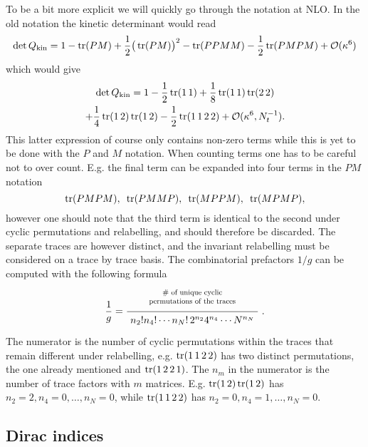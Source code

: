 To be a bit more explicit we will quickly go through the notation at NLO. In the
old notation the kinetic determinant would read
%
\begin{equation} \label{eq:expanded_pm_notation}
  \det Q_{\text{kin}} = 1 - \operatorname{tr}(PM) + \frac{1}{2} \big(\operatorname{tr}(PM)\big)^2 - \operatorname{tr}(PPMM) -
    \frac{1}{2} \operatorname{tr}(PMPM) + \mathcal{O}(\kappa^6)
\end{equation}
%
which would give
%
\begin{multline}
  \det Q_{\text{kin}} = 
    1 - \frac{1}{2} \operatorname{tr}(1\,1) + \frac{1}{8} \operatorname{tr}(1\,1) \operatorname{tr}(2\,2) \\
    + \frac{1}{4}\operatorname{tr} (1\,2) \operatorname{tr} (1\,2) - \frac{1}{2} \operatorname{tr}(1\,1\,2\,2) +
    \mathcal{O}(\kappa^6, N_t^{-1}).
\end{multline}
%
This latter expression of course only contains non-zero terms while this is yet
to be done with the $P$ and $M$ notation. When counting terms one has to be
careful not to over count. E.g. the final term can be expanded into four terms
in the $PM$ notation
%
\begin{equation}
  \operatorname{tr}(PMPM), \hskip.5em \operatorname{tr}(PMMP), \hskip.5em \operatorname{tr}(MPPM), \hskip.5em \operatorname{tr}(MPMP),
\end{equation}
%
however one should note that the third term is identical to the second under
cyclic permutations and relabelling, and should therefore be discarded. The
separate traces are however distinct, and the invariant relabelling must be
considered on a trace by trace basis. The combinatorial prefactors $1/g$ can be
computed with the following formula
%
\begin{equation}
  \frac{1}{g}=
    \frac{%
      \tikz \node [anchor=north east,scale=0.75,align=center] {\# of unique cyclic \\ permutations of the traces};
    }{%
      \tikz \node {$n_2!n_4!\cdots{}n_N!\, 2^{n_2} 4^{n_4} \cdots N^{n_N}$};
    } \;.
\end{equation}
%
The numerator is the number of cyclic permutations within the traces that
remain different under relabelling, e.g. $\operatorname{tr}(1\,1\,2\,2)$ has two distinct
permutations, the one already mentioned and $\operatorname{tr}(1\,2\,2\,1)$. The $n_m$ in the
numerator is the number of trace factors with $m$ matrices. E.g.
$\operatorname{tr}(1\,2)\operatorname{tr}(1\,2)$ has $n_2 = 2, n_4 = 0, \dots, n_N = 0$, while
$\operatorname{tr}(1\,1\,2\,2)$ has $n_2 = 0, n_4 = 1, \dots, n_N = 0$.

\subsection{Dirac indices} \label{sec:dirac_indices}

